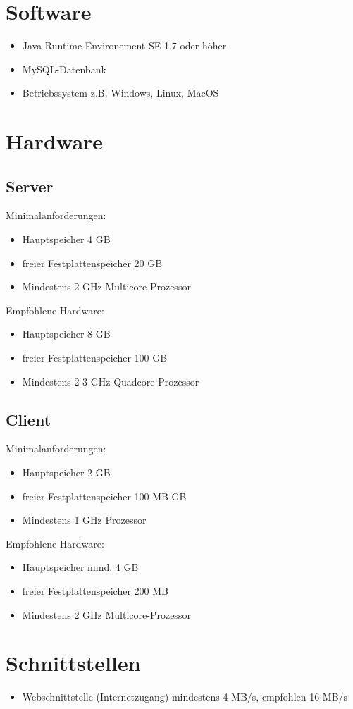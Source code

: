\section{Software}
   \begin{itemize}
      \item Java Runtime Environement SE 1.7 oder höher
      \item MySQL-Datenbank
      \item Betriebssystem z.B. Windows, Linux, MacOS
   \end{itemize}
\section{Hardware}
\label{sec:empfohleneHardware}
   \subsection{Server}
	Minimalanforderungen:
   \begin{itemize}
      \item Hauptspeicher 4 GB
      \item freier Festplattenspeicher 20 GB
      \item Mindestens 2 GHz Multicore-Prozessor
   \end{itemize}
   Empfohlene Hardware:
   \begin{itemize}
      \item Hauptspeicher 8 GB
      \item freier Festplattenspeicher 100 GB
      \item Mindestens 2-3 GHz Quadcore-Prozessor
   \end{itemize}
   \subsection{Client}
   	Minimalanforderungen:
   \begin{itemize}
      \item Hauptspeicher 2 GB
      \item freier Festplattenspeicher 100 MB GB
      \item Mindestens 1 GHz Prozessor
   \end{itemize}
   Empfohlene Hardware:
   \begin{itemize}
      \item Hauptspeicher mind. 4 GB
      \item freier Festplattenspeicher 200 MB
      \item Mindestens 2 GHz Multicore-Prozessor
   \end{itemize}
\section{Schnittstellen}
   \begin{itemize}
   \item Webschnittstelle (Internetzugang) mindestens 4 MB/s, empfohlen 16 MB/s
   \end{itemize}